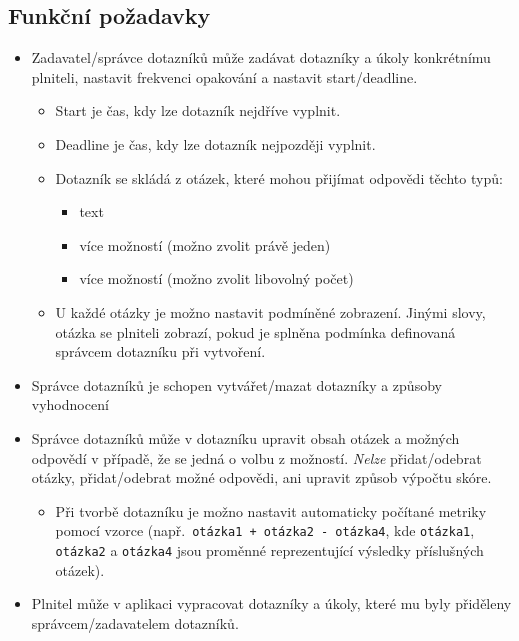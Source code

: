 \subsection{Funkční požadavky}\label{subsec:funkcni-pozadavky}
\begin{itemize}
\item
Zadavatel/správce dotazníků může zadávat dotazníky a úkoly konkrétnímu plniteli, nastavit frekvenci opakování a nastavit start/deadline.

  \begin{itemize}
  \item
    Start je čas, kdy lze dotazník nejdříve vyplnit.
  \item
    Deadline je čas, kdy lze dotazník nejpozději vyplnit.
  \item
    Dotazník se skládá z otázek, které mohou přijímat odpovědi těchto typů:

    \begin{itemize}
    \item
      text
    \item
      více možností (možno zvolit právě jeden)
    \item
      více možností (možno zvolit libovolný počet)
    \end{itemize}
  \item
  U každé otázky je možno nastavit podmíněné zobrazení.
  Jinými slovy, otázka se plniteli zobrazí, pokud je splněna podmínka definovaná správcem dotazníku při vytvoření.
  \end{itemize}
\item
Správce dotazníků je schopen vytvářet/mazat dotazníky a způsoby vyhodnocení
\item
Správce dotazníků může v dotazníku upravit obsah otázek a možných odpovědí v případě, že se jedná o volbu z možností.
\textit{Nelze} přidat/odebrat otázky, přidat/odebrat možné odpovědi, ani upravit způsob výpočtu skóre.

  \begin{itemize}
  \item
    Při tvorbě dotazníku je možno nastavit automaticky počítané metriky pomocí vzorce (např.\ \texttt{otázka1\ +\ otázka2\ -\ otázka4}, kde \texttt{otázka1}, \texttt{otázka2} a \texttt{otázka4} jsou proměnné reprezentující výsledky příslušných otázek).
  \end{itemize}
\item
Plnitel může v aplikaci vypracovat dotazníky a úkoly, které mu byly přiděleny správcem/zadavatelem dotazníků.


\end{itemize}
